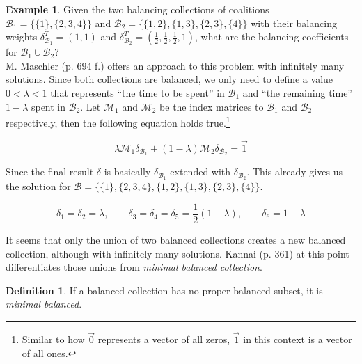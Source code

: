 \documentclass[10pt,a4paper,titlepage]{article}
\theoremstyle{plain}
\theoremstyle{definition}
\newtheorem{definition}[thm]{Definition} %
\newtheorem{example}[thm]{Example} %
\begin{document}
\begin{example}\label{ex:isbalanced2}
    Given the two balancing collections of coalitions $\mathcal{B}_1 = \{\{1\}, \{2, 3, 4\}\}$ and $\mathcal{B}_2 = \{\{1, 2\}, \{1, 3\}, \{2, 3\}, \{4\}\}$ with their balancing weights $\delta_{\mathcal{B}_1}^T = (1, 1)$ and $\delta_{\mathcal{B}_2}^T = (\frac{1}{2}, \frac{1}{2}, \frac{1}{2}, 1) $, what are the balancing coefficients for $\mathcal{B}_1 \cup \mathcal{B}_2$?\\

    M. Maschler\cite{maschler} (p. 694 f.) offers an approach to this problem with infinitely many solutions. Since both collections are balanced, we only need to define a value $0 < \lambda < 1$ that represents \enquote{the time to be spent} in $\mathcal{B}_1$ and \enquote{the remaining time} $1 - \lambda$ spent in $\mathcal{B}_2$. Let $\mathcal{M}_1$ and $\mathcal{M}_2$ be the index matrices to $\mathcal{B}_1$ and $\mathcal{B}_2$ respectively, then the following equation holds true.\footnote{Similar to how $\vec{0}$ represents a vector of all zeros, $\vec{1}$ in this context is a vector of all ones.}\vspace{-10pt}

    \begin{equation*}
        \lambda \mathcal{M}_1 \delta_{\mathcal{B}_1} + (1 - \lambda) \mathcal{M}_2 \delta_{\mathcal{B}_2} = \vec{1}
    \end{equation*}

    Since the final result $\delta$ is basically $\delta_{\mathcal{B}_1}$ extended with $\delta_{\mathcal{B}_2}$. This already gives us the solution for $\mathcal{B} = \{\{1\}, \{2, 3, 4\}, \{1, 2\}, \{1, 3\}, \{2, 3\}, \{4\}\}$.

    \begin{equation*}
        \delta_1 = \delta_2 = \lambda,\qquad\delta_3 = \delta_4 = \delta_5 = \frac{1}{2}(1 - \lambda),\qquad\delta_6 = 1 - \lambda
    \end{equation*}
\end{example}

It seems that only the union of two balanced collections creates a new balanced collection, although with infinitely many solutions. Kannai\cite{kannai} (p. 361) at this point differentiates those unions from \textit{minimal balanced collection}.

\begin{definition}
    If a balanced collection has no proper balanced subset, it is \textit{minimal balanced}.
\end{definition}
\end{document}
